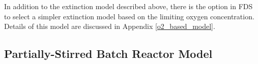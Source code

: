 %
%
%

In addition to the extinction model described above, there is the option in FDS to select a simpler extinction model based on the limiting oxygen concentration. Details of this model are discussed in Appendix \ref{o2_based_model}.


\subsection{Partially-Stirred Batch Reactor Model}
\label{sec:batchreactormodel}

